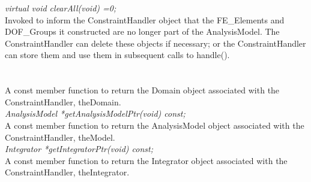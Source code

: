 {\em virtual void clearAll(void) =0;} \\
Invoked to inform the ConstraintHandler object that the FE\_Elements
and DOF\_Groups it constructed are no longer part of the AnalysisModel. The
ConstraintHandler can delete these objects if necessary; or the
ConstraintHandler can store them and use them in subsequent calls to
handle(). \\ 

  \\
 \\
A const member function to return the Domain object associated with
the ConstraintHandler, \p theDomain. \\

{\em AnalysisModel *getAnalysisModelPtr(void) const;} \\
A const member function to return the AnalysisModel object associated with
the ConstraintHandler, \p theModel. \\

{\em Integrator *getIntegratorPtr(void) const;} \\
A const member function to return the Integrator object associated with
the ConstraintHandler, \p theIntegrator. 





